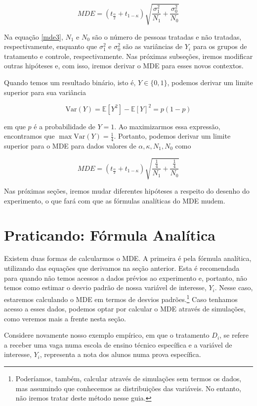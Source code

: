 \begin{equation}\label{mde3}
    MDE = (t_{\frac{\alpha}{2}} + t_{1-\kappa})\sqrt{\frac{\sigma^2_1}{N_1} + \frac{\sigma^2_0}{N_0}}
\end{equation}

Na equação \ref{mde3}, $N_1$ e $N_0$ são o número de pessoas tratadas e não tratadas, respectivamente, enquanto que $\sigma_1^2$ e $\sigma_0^2$ são as variâncias de $Y_i$ para os grupos de tratamento e controle, respectivamente. Nas próximas subseções, iremos modificar outras hipóteses e, com isso, iremos derivar o MDE para esses novos contextos.

Quando temos um resultado binário, isto é, $Y \in \{0,1\}$, podemos derivar um limite superior para sua variância

    $$
    \mathrm{Var}(Y) = \mathbb{E}[Y^2] - \mathbb{E}[Y]^2 = p(1-p)
    $$

    em que $p$ é a probabilidade de $Y = 1$. Ao maximizarmos essa expressão, encontramos que $\max \mathrm{Var}(Y) = \frac{1}{4}$. Portanto, podemos derivar um limite superior para o MDE para dados valores de $\alpha, \kappa, N_1, N_0$ como

    $$
    MDE = (t_{\frac{\alpha}{2}} + t_{1-\kappa})\sqrt{\frac{\frac{1}{4}}{N_1} + \frac{\frac{1}{4}}{N_0}}
    $$

Nas próximas seções, iremos mudar diferentes hipóteses a respeito do desenho do experimento, o que fará com que as fórmulas analíticas do MDE mudem.

\section{Praticando: Fórmula Analítica}\label{rct_fa}

Existem duas formas de calcularmos o MDE. A primeira é pela fórmula analítica, utilizando das equações que derivamos na seção anterior. Esta é recomendada para quando não temos acessos a dados prévios ao experimento e, portanto, não temos como estimar o desvio padrão de nossa variável de interesse, $Y_i$. Nesse caso, estaremos calculando o MDE em termos de desvios padrões.\footnote{Poderíamos, também, calcular através de simulações sem termos os dados, mas assumindo que conhecemos as distribuições das variáveis. No entanto, não iremos tratar deste método nesse guia.} Caso tenhamos acesso a esses dados, podemos optar por calcular o MDE através de simulações, como veremos mais a frente nesta seção. 

Considere novamente nosso exemplo empírico, em que o tratamento $D_i$, se refere a receber uma vaga numa escola de ensino técnico específica e a variável de interesse, $Y_i$, representa a nota dos alunos numa prova específica. 

